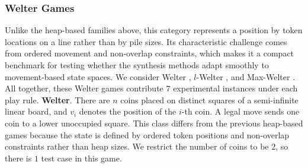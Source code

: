 \documentclass[review]{elsarticle}
\newcommand{\set}[1]{\{ #1 \}}
\newcommand{\tuple}[1]{\langle {#1} \rangle}
\newcommand{\true}{\top}
\newcommand{\statevar}{\mathcal{X}}
\newcommand{\act}{\mathcal{A}}
\newcommand{\constraint}{\mathcal{C}}
\newcommand{\estate}{\mathcal{E}}
\newcommand{\pre}{\mathtt{pre}}
\newcommand{\eff}{\mathtt{eff}}
\begin{document}
{\color{red}\subsubsection{Welter Games}}
{\color{red}Unlike the heap-based families above, this category represents a position by token locations on a line rather than by pile sizes.}
{\color{red}Its characteristic challenge comes from ordered movement and non-overlap constraints, which makes it a compact benchmark for testing whether the synthesis methods adapt smoothly to movement-based state spaces.}
{\color{red}We consider Welter \cite{Wel1952}, $l$-Welter \cite{KahF1987}, and Max-Welter \cite{Ho2014}.}
{\color{red}All together, these Welter games contribute $7$ experimental instances under each play rule.}
{\color{red}\textbf{Welter}. There are $n$ coins placed on distinct squares of a semi-infinite linear board, and $v_i$ denotes the position of the $i$-th coin.}
{\color{red}A legal move sends one coin to a lower unoccupied square.}
{\color{red}This class differs from the previous heap-based games because the state is defined by ordered token positions and non-overlap constraints rather than heap sizes.}
{\color{red}We restrict the number of coins to be $2$, so there is $1$ test case in this game.}
\end{document}

